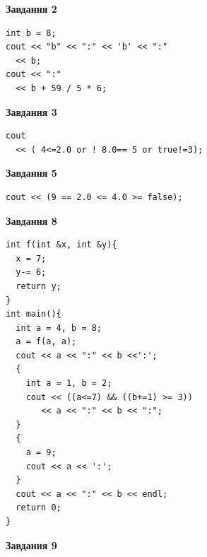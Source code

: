 \documentclass[12pt, ukrainian]{article}
\begin{document}
{\begin {large}
\begin{minipage}[t]{7.0cm}
\end{minipage}
\vline \hspace{1mm}
\begin{minipage}[t]{11.0cm}

\begin{center}
\textbf{Завдання 2}
\end{center}
\vspace{-8mm}

\begin{verbatim}
int b = 8;
cout << "b" << ":" << 'b' << ":" 
  << b;
cout << ":" 
  << b + 59 / 5 * 6;
\end{verbatim}



\begin{center}
\textbf{Завдання 3}
\end{center}
\vspace{-8mm}

\begin{verbatim}
cout 
  << ( 4<=2.0 or ! 8.0== 5 or true!=3);
\end{verbatim}



\begin{center}
\textbf{Завдання 5}
\end{center}
\vspace{-8mm}

\begin{verbatim}
cout << (9 == 2.0 <= 4.0 >= false);
\end{verbatim}



\begin{center}
\textbf{Завдання 8}
\end{center}
\vspace{-8mm}

\begin{verbatim}
int f(int &x, int &y){
  x = 7;
  y-= 6;
  return y;
}
int main(){
  int a = 4, b = 8;
  a = f(a, a);
  cout << a << ":" << b <<':';
  {
    int a = 1, b = 2;
    cout << ((a<=7) && ((b+=1) >= 3))
       << a << ":" << b << ":";
  }
  {
    a = 9;
    cout << a << ':';
  }
  cout << a << ":" << b << endl;
  return 0;
}
\end{verbatim}

\end{minipage}


\begin{minipage}[t]{7.0cm}

\begin{center}
\textbf{Завдання 9}
\end{center}
\vspace{-8mm}


\end{minipage}
\end{large}}
\end{document}
